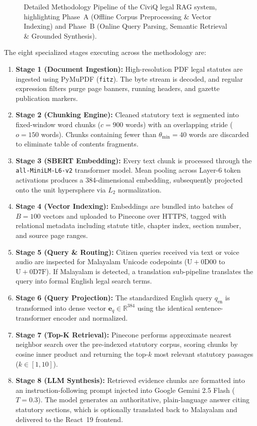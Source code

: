 \documentclass[12pt,a4paper]{report}
\begin{document}
\begin{figure}[htbp]
    \centering
    \caption{Detailed Methodology Pipeline of the CiviQ legal RAG system, highlighting Phase~A (Offline Corpus Preprocessing \& Vector Indexing) and Phase~B (Online Query Parsing, Semantic Retrieval \& Grounded Synthesis).}
    \label{fig:framework}
\end{figure}

The eight specialized stages executing across the methodology are:
\begin{enumerate}\setlength{\itemsep}{3pt}\setlength{\parskip}{0pt}\setlength{\parsep}{0pt}
    \item \textbf{Stage 1 (Document Ingestion):} High-resolution PDF legal statutes are ingested using PyMuPDF (\texttt{fitz}). The byte stream is decoded, and regular expression filters purge page banners, running headers, and gazette publication markers.
    \item \textbf{Stage 2 (Chunking Engine):} Cleaned statutory text is segmented into fixed-window word chunks ($c = 900$ words) with an overlapping stride ($o = 150$ words). Chunks containing fewer than $\theta_{\min} = 40$ words are discarded to eliminate table of contents fragments.
    \item \textbf{Stage 3 (SBERT Embedding):} Every text chunk is processed through the \texttt{all-MiniLM-L6-v2} transformer model. Mean pooling across Layer-6 token activations produces a 384-dimensional embedding, subsequently projected onto the unit hypersphere via $L_2$ normalization.
    \item \textbf{Stage 4 (Vector Indexing):} Embeddings are bundled into batches of $B = 100$ vectors and uploaded to Pinecone over HTTPS, tagged with relational metadata including statute title, chapter index, section number, and source page ranges.
    \item \textbf{Stage 5 (Query \& Routing):} Citizen queries received via text or voice audio are inspected for Malayalam Unicode codepoints ($\mathrm{U{+}0D00}$ to $\mathrm{U{+}0D7F}$). If Malayalam is detected, a translation sub-pipeline translates the query into formal English legal search terms.
    \item \textbf{Stage 6 (Query Projection):} The standardized English query $q_{\mathrm{en}}$ is transformed into dense vector $\mathbf{e}_q \in \mathbb{R}^{384}$ using the identical sentence-transformer encoder and normalized.
    \item \textbf{Stage 7 (Top-K Retrieval):} Pinecone performs approximate nearest neighbor search over the pre-indexed statutory corpus, scoring chunks by cosine inner product and returning the top-$k$ most relevant statutory passages ($k \in [1, 10]$).
    \item \textbf{Stage 8 (LLM Synthesis):} Retrieved evidence chunks are formatted into an instruction-following prompt injected into Google Gemini 2.5 Flash ($T = 0.3$). The model generates an authoritative, plain-language answer citing statutory sections, which is optionally translated back to Malayalam and delivered to the React~19 frontend.
\end{enumerate}
\end{document}
